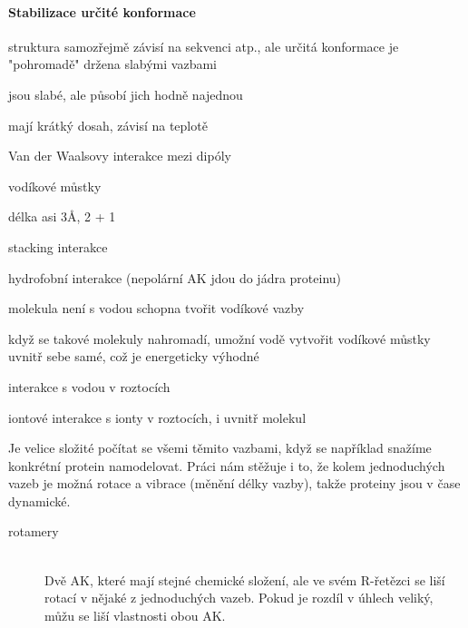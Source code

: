 \documentclass[DIV=8]{scrreprt}
\begin{document}
\paragraph{Stabilizace určité konformace}
\begin{myItemize}[nosep]
    \item struktura samozřejmě závisí na sekvenci atp., ale určitá konformace je "pohromadě" držena slabými vazbami
\begin{myItemize}[nosep]
    \item jsou slabé, ale působí jich hodně najednou
    \item mají krátký dosah, závisí na teplotě
\end{myItemize}

    \item Van der Waalsovy interakce mezi dipóly
    \item vodíkové můstky
\begin{myItemize}[nosep]
    \item délka asi 3Å, 2 + 1
\end{myItemize}

    \item stacking interakce
    \item hydrofobní interakce (nepolární AK jdou do jádra proteinu)
\begin{myItemize}[nosep]
    \item molekula není s vodou schopna tvořit vodíkové vazby
    \item když se takové molekuly nahromadí, umožní vodě vytvořit vodíkové můstky uvnitř sebe samé, což je energeticky výhodné
\end{myItemize}

    \item interakce s vodou v roztocích
    \item iontové interakce s ionty v roztocích, i uvnitř molekul
\end{myItemize}



Je velice složité počítat se všemi těmito vazbami, když se například snažíme konkrétní protein namodelovat. Práci nám stěžuje i to, že kolem jednoduchých vazeb je možná rotace a vibrace (měnění délky vazby), takže proteiny jsou v čase dynamické.

\begin{description}
\item[rotamery]\hfill \\
Dvě AK, které mají stejné chemické složení, ale ve svém R-řetězci se liší rotací v nějaké z jednoduchých vazeb. Pokud je rozdíl v úhlech veliký, můžu se liší vlastnosti obou AK.

\end{description}
\end{document}
